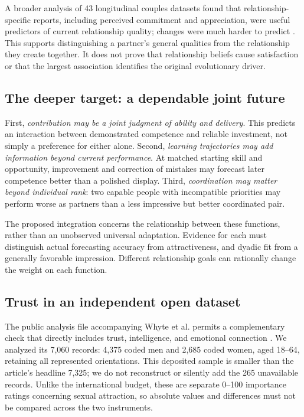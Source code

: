 \documentclass[10pt,twocolumn,letterpaper]{article}
\begin{document}
A broader analysis of 43 longitudinal couples datasets found that relationship-specific reports, including perceived commitment and appreciation, were useful predictors of current relationship quality; changes were much harder to predict \citep{joel2020}. This supports distinguishing a partner's general qualities from the relationship they create together. It does not prove that relationship beliefs cause satisfaction or that the largest association identifies the original evolutionary driver.



\subsection{The deeper target: a dependable joint future}
First, \emph{contribution may be a joint judgment of ability and delivery}. This predicts an interaction between demonstrated competence and reliable investment, not simply a preference for either alone. Second, \emph{learning trajectories may add information beyond current performance}. At matched starting skill and opportunity, improvement and correction of mistakes may forecast later competence better than a polished display. Third, \emph{coordination may matter beyond individual rank}: two capable people with incompatible priorities may perform worse as partners than a less impressive but better coordinated pair.

The proposed integration concerns the relationship between these functions, rather than an unobserved universal adaptation. Evidence for each must distinguish actual forecasting accuracy from attractiveness, and dyadic fit from a generally favorable impression. Different relationship goals can rationally change the weight on each function.

\subsection{Trust in an independent open dataset}
\label{sec:whyte}
The public analysis file accompanying Whyte et al. permits a complementary check that directly includes trust, intelligence, and emotional connection \citep{whyte2021}. We analyzed its 7,060 records: 4,375 coded men and 2,685 coded women, aged 18--64, retaining all represented orientations. This deposited sample is smaller than the article's headline 7,325; we do not reconstruct or silently add the 265 unavailable records. Unlike the international budget, these are separate 0--100 importance ratings concerning sexual attraction, so absolute values and differences must not be compared across the two instruments.
\end{document}
